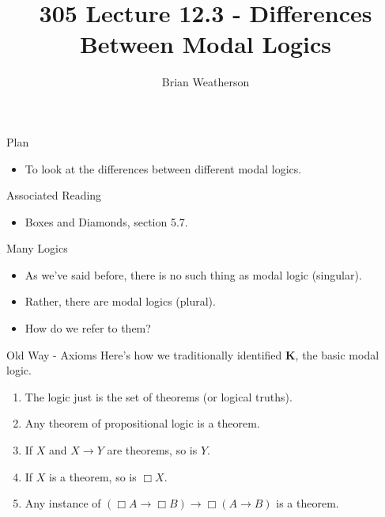 \documentclass[
  ignorenonframetext,
]{beamer}
\title{305 Lecture 12.3 - Differences Between Modal Logics}
\author{Brian Weatherson}
\date{}
\providecommand{\tightlist}{%
  \setlength{\itemsep}{0pt}\setlength{\parskip}{0pt}}
\renewcommand{\,}{\text{, }}
\begin{document}
\frame{\titlepage}

\begin{frame}{Plan}
\protect\hypertarget{plan}{}
\begin{itemize}
\tightlist
\item
  To look at the differences between different modal logics.
\end{itemize}
\end{frame}

\begin{frame}{Associated Reading}
\protect\hypertarget{associated-reading}{}
\begin{itemize}
\tightlist
\item
  Boxes and Diamonds, section 5.7.
\end{itemize}
\end{frame}

\begin{frame}{Many Logics}
\protect\hypertarget{many-logics}{}
\begin{itemize}
\tightlist
\item
  As we've said before, there is no such thing as modal logic
  (singular).
\item
  Rather, there are modal logics (plural).
\item
  How do we refer to them?
\end{itemize}
\end{frame}

\begin{frame}{Old Way - Axioms}
\protect\hypertarget{old-way---axioms}{}
Here's how we traditionally identified \textbf{K}, the basic modal
logic.

\begin{enumerate}
\tightlist
\item
  The logic just is the set of theorems (or logical truths).
\item
  Any theorem of propositional logic is a theorem.
\item
  If \(X\) and \(X \rightarrow Y\) are theorems, so is \(Y\).
\item
  If \(X\) is a theorem, so is \(\Box X\).
\item
  Any instance of
  \((\Box A \rightarrow \Box B) \rightarrow \Box (A \rightarrow B)\) is
  a theorem.
\end{enumerate}
\end{frame}
\end{document}
